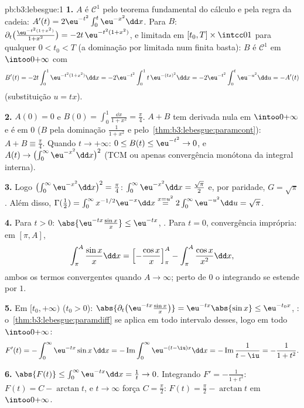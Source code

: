 \begin{solution}{pb:b3:lebesgue:1}
\textbf{1.} $A$ é $\mathcal C^1$ pelo teorema fundamental
do cálculo e pela regra da cadeia: $A'(t) =
2\eu^{-t^2}\int_0^t\eu^{-x^2}\dd x$. Para $B$:
$\partial_t\bigl(\frac{\eu^{-t^2(1+x^2)}}{1+x^2}\bigr) =
-2t\,\eu^{-t^2(1+x^2)}$,  e limitada em $[t_0, T]
\times \intcc01$ para qualquer $0 < t_0 < T$ (a dominação por limitada num
 finita basta): $B$ é $\mathcal C^1$ em
$\intoo0{+\infty}$ com
\[
B'(t) = -2t\int_0^1 \eu^{-t^2(1+x^2)}\dd x
= -2\eu^{-t^2}\int_0^1 t\,\eu^{-(tx)^2}\dd x
= -2\eu^{-t^2}\int_0^t\eu^{-u^2}\dd u = -A'(t)
\]
(substituição $u = tx$).

\textbf{2.} $A(0) = 0$ e $B(0) = \int_0^1\frac{\dd x}{1+x^2}
= \frac\pi4$. $A + B$ tem derivada nula em
$\intoo0{+\infty}$ e é  em $0$ ($B$ pela
dominação $\frac1{1+x^2}$ e pelo~\cref{thm:b3:lebesgue:paramcont}): $A + B \equiv \frac\pi4$.
Quando $t\to+\infty$: $0 \leq B(t) \leq \eu^{-t^2} \to 0$, e
$A(t) \to \bigl(\int_0^\infty\eu^{-x^2}\dd x\bigr)^2$ (TCM ou
apenas convergência monótona da integral interna).

\textbf{3.} Logo $\bigl(\int_0^\infty\eu^{-x^2}\dd x\bigr)^2
= \frac\pi4$: $\int_0^\infty\eu^{-x^2}\dd x =
\frac{\sqrt\pi}2$ e, por paridade, $G = \sqrt\pi$. Além disso,
$\Gamma(\frac12) = \int_0^\infty x^{-1/2}\eu^{-x}\dd x
\overset{x = u^2}{=} 2\int_0^\infty\eu^{-u^2}\dd u =
\sqrt\pi$.

\textbf{4.} Para $t > 0$: $\abs{\eu^{-tx}\frac{\sin x}x} \leq
\eu^{-tx}$, . Para $t = 0$, convergência imprópria: em
$[\pi, A]$,
\[
\int_\pi^A\frac{\sin x}x\dd x
= \Bigl[-\frac{\cos x}x\Bigr]_\pi^A -
\int_\pi^A\frac{\cos x}{x^2}\dd x,
\]
ambos os termos convergentes quando $A \to \infty$; perto de $0$ o integrando
se estende  por $1$.

\textbf{5.} Em $[t_0, +\infty)$ ($t_0 > 0$):
$\abs{\partial_t\bigl(\eu^{-tx}\tfrac{\sin x}x\bigr)} =
\eu^{-tx}\abs{\sin x} \leq \eu^{-t_0x}$, :
o~\cref{thm:b3:lebesgue:paramdiff} se aplica em todo intervalo desses,
logo em todo $\intoo0{+\infty}$:
\[
F'(t) = -\int_0^\infty\eu^{-tx}\sin x\,\dd x
= -\operatorname{Im}\int_0^\infty\eu^{-(t - \iu)x}\dd x
= -\operatorname{Im}\frac{1}{t - \iu} = -\frac{1}{1 + t^2}.
\]

\textbf{6.} $\abs{F(t)} \leq \int_0^\infty\eu^{-tx}\dd x =
\frac1t \to 0$. Integrando $F' = -\frac1{1+t^2}$: $F(t) = C -
\arctan t$, e $t \to \infty$ força $C = \frac\pi2$: $F(t) =
\frac\pi2 - \arctan t$ em $\intoo0{+\infty}$.


\end{solution}
